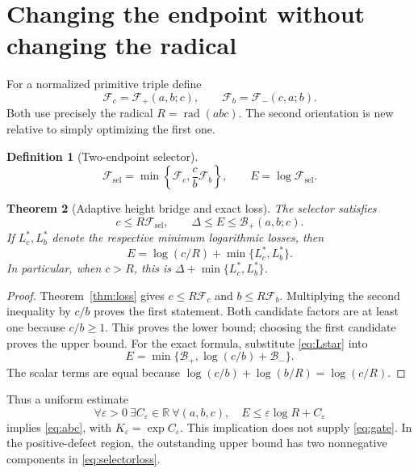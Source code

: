 \documentclass[11pt]{article}
\newtheorem{theorem}{Theorem}[section]
\theoremstyle{definition}\newtheorem{definition}[theorem]{Definition}
\theoremstyle{remark}\newtheorem{remark}[theorem]{Remark}
\DeclareMathOperator{\rad}{rad}
\newcommand{\F}{\mathcal F}
\newcommand{\B}{\mathcal B}
\begin{document}
\section{Changing the endpoint without changing the radical}
For a normalized primitive triple define
\[
 \F_c=\F_+(a,b;c),\qquad
 \F_b=\F_-(c,a;b).
\]
Both use precisely the radical \(R=\rad(abc)\). The second orientation is new relative to simply optimizing the first one.
\begin{definition}[Two-endpoint selector]
\[
 \F_{\mathrm{sel}}=\min\left\{\F_c,\frac cb\F_b\right\},\qquad
 E=\log\F_{\mathrm{sel}}.
\]
\end{definition}
\begin{theorem}[Adaptive height bridge and exact loss]\label{thm:selector}
The selector satisfies
\begin{equation}\label{eq:bridge}
 c\le R\F_{\mathrm{sel}},\qquad
 \Delta\le E\le\B_+(a,b;c).
\end{equation}
If \(L_c^*,L_b^*\) denote the respective minimum logarithmic losses, then
\begin{equation}\label{eq:selectorloss}
 E=\log(c/R)+\min\{L_c^*,L_b^*\}.
\end{equation}
In particular, when \(c>R\), this is \(\Delta+\min\{L_c^*,L_b^*\}\).
\end{theorem}
\begin{proof}
Theorem~\ref{thm:loss} gives \(c\le R\F_c\) and \(b\le R\F_b\). Multiplying the second inequality by \(c/b\) proves the first statement. Both candidate factors are at least one because \(c/b\ge1\). This proves the lower bound; choosing the first candidate proves the upper bound. For the exact formula, substitute \eqref{eq:Lstar} into
\[
 E=\min\{\B_+,\log(c/b)+\B_-\}.
\]
The scalar terms are equal because \(\log(c/b)+\log(b/R)=\log(c/R)\).
\end{proof}
Thus a uniform estimate
\begin{equation}\label{eq:gate}
 \forall\varepsilon>0\ \exists C_\varepsilon\in\mathbb R\ \forall(a,b,c),\quad
 E\le\varepsilon\log R+C_\varepsilon
\end{equation}
implies \eqref{eq:abc}, with \(K_\varepsilon=\exp C_\varepsilon\). This implication does not supply \eqref{eq:gate}. In the positive-defect region, the outstanding upper bound has two nonnegative components in \eqref{eq:selectorloss}.
\end{document}
